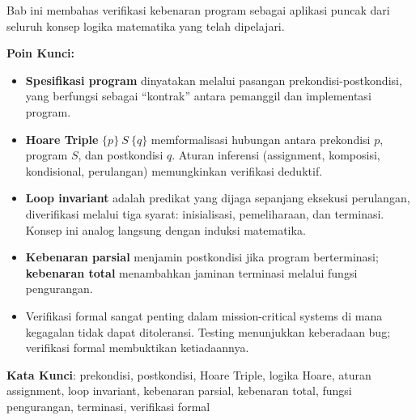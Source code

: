 \documentclass[../main]{subfiles}
\begin{document}

\begin{rangkuman}
Bab ini membahas verifikasi kebenaran program sebagai aplikasi puncak dari seluruh konsep logika matematika yang telah dipelajari.

\textbf{Poin Kunci:}
\begin{itemize}
  \item \textbf{Spesifikasi program} dinyatakan melalui pasangan prekondisi-postkondisi, yang berfungsi sebagai ``kontrak'' antara pemanggil dan implementasi program.
  \item \textbf{Hoare Triple} $\{p\}\ S\ \{q\}$ memformalisasi hubungan antara prekondisi $p$, program $S$, dan postkondisi $q$. Aturan inferensi (assignment, komposisi, kondisional, perulangan) memungkinkan verifikasi deduktif.
  \item \textbf{Loop invariant} adalah predikat yang dijaga sepanjang eksekusi perulangan, diverifikasi melalui tiga syarat: inisialisasi, pemeliharaan, dan terminasi. Konsep ini analog langsung dengan induksi matematika.
  \item \textbf{Kebenaran parsial} menjamin postkondisi jika program berterminasi; \textbf{kebenaran total} menambahkan jaminan terminasi melalui fungsi pengurangan.
  \item Verifikasi formal sangat penting dalam mission-critical systems di mana kegagalan tidak dapat ditoleransi. Testing menunjukkan keberadaan bug; verifikasi formal membuktikan ketiadaannya.
\end{itemize}

\textbf{Kata Kunci}: prekondisi, postkondisi, Hoare Triple, logika Hoare, aturan assignment, loop invariant, kebenaran parsial, kebenaran total, fungsi pengurangan, terminasi, verifikasi formal
\end{rangkuman}

\ifSubfilesClassLoaded{
  \renewcommand{\bibname}{Daftar Pustaka}
  
  
}{}
\end{document}
